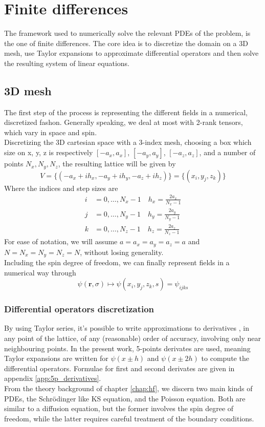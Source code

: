 \section{Finite differences}
The framework used to numerically solve the relevant PDEs of the problem, is the one of finite differences. The core idea is to discretize the domain on a 3D mesh, use Taylor expansions to approximate differential operators and then solve the resulting system of linear equations.
\subsection{3D mesh}
The first step of the process is representing the different fields in a numerical, discretized fashon.
Generally speaking, we deal at most with 2-rank tensors, which vary in space and spin. 
\\Discretizing the 3D cartesian space with a 3-index mesh, choosing a box which size on x, y, z is respectively $[-a_x, a_x]$, $[-a_y, a_y]$, $[-a_z, a_z]$, and a number of points $N_x, N_y, N_z$, the resulting lattice will be given by
\begin{equation*}
V=\{(-a_x+ih_x, -a_y+ih_y, -a_z+ih_z)\} = \{(x_i, y_j,z_k)\} 
\end{equation*}
Where the indices and step sizes are
\begin{align*}
  i&=0,\ldots,N_x-1\quad h_x = \frac{2a_x}{N_x-1}\\
  j&=0,\ldots,N_y-1\quad h_y = \frac{2a_y}{N_y-1}\\
  k&=0,\ldots,N_z-1\quad h_z = \frac{2a_z}{N_z-1}
\end{align*}
For ease of notation, we will assume $a=a_x=a_y=a_z=a$ and $N=N_x=N_y=N_z=N$, without losing generality.
\\Including the spin degree of freedom, we can finally represent fields in a numerical way through
\begin{equation}
    \psi(\bm r, \sigma) \mapsto \psi(x_i, y_j, z_k, s) = \psi_{ijks}
\end{equation}
\subsubsection{Differential operators discretization}
By using Taylor series, it's possible to write approximations to derivatives \cite{Zhou1993}, in any point of the lattice, of any (reasonable) order of accuracy, involving only near neighbouring points. In the present work, 5-points derivates are used, meaning Taylor expansions are written for $\psi(x\pm h)$ and $\psi(x\pm 2h)$ to compute the differential operators. Formulae for first and second derivates are given in appendix \ref{app:5p_derivatives}.
\\From the theory background of chapter \ref{chap:hf}, we discern two main kinds of PDEs, the Schr\"odinger like KS equation, and the Poisson equation. Both are similar to a diffusion equation, but the former involves the spin degree of freedom, while the latter requires careful treatment of the boundary conditions.
